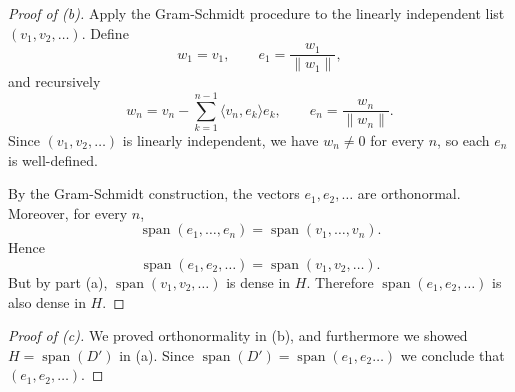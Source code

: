 \begin{proof}[Proof of (b)]
    Apply the Gram-Schmidt procedure to the linearly independent list
    $(v_1,v_2,\ldots)$. Define
    \[
        w_1 = v_1, \qquad e_1 = \frac{w_1}{\|w_1\|},
    \]
    and recursively
    \[
        w_n = v_n - \sum_{k=1}^{n-1} \langle v_n,e_k\rangle e_k,
        \qquad
        e_n = \frac{w_n}{\|w_n\|}.
    \]
    Since $(v_1,v_2,\ldots)$ is linearly independent, we have
    $w_n \neq 0$ for every $n$, so each $e_n$ is well-defined.

    By the Gram-Schmidt construction, the vectors $e_1,e_2,\ldots$
    are orthonormal. Moreover, for every $n$,
    \[
        \operatorname{span}(e_1,\ldots,e_n)
        =
        \operatorname{span}(v_1,\ldots,v_n).
    \]
    Hence
    \[
        \operatorname{span}(e_1,e_2,\ldots)
        =
        \operatorname{span}(v_1,v_2,\ldots).
    \]
    But by part (a), $\operatorname{span}(v_1,v_2,\ldots)$ is dense
    in $H$. Therefore $\operatorname{span}(e_1,e_2,\ldots)$ is also
    dense in $H$.
\end{proof}

\begin{proof}[Proof of (c)]
    We proved orthonormality in (b), and furthermore we showed 
    $H = \operatorname{span}(D')$ in (a). 
    Since $\operatorname{span}(D') = 
    \operatorname{span}(e_1,e_2\ldots)$
    we conclude that $(e_1,e_2,\ldots)$.
\end{proof}




